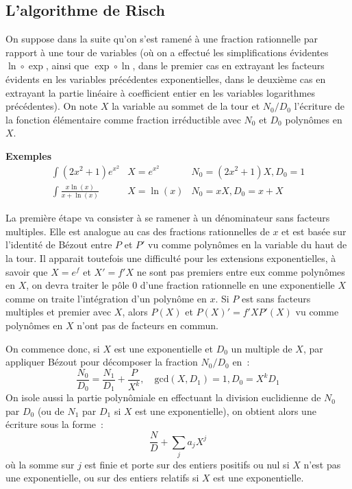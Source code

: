 \documentclass[a4paper,11pt]{book}
\begin{document}
\begin{giacjshere}
\section{L'algorithme de Risch} \label{sec:risch}
On suppose dans la suite qu'on s'est ramené à une fraction rationnelle
par rapport à une tour de variables (où on a effectué les simplifications
évidentes $\ln \circ \exp$, ainsi que $\exp \circ \ln$, dans le
premier cas en extrayant les facteurs évidents en les variables
précédentes exponentielles, dans le deuxième cas en extrayant la
partie linéaire à coefficient entier en les variables logarithmes
précédentes).
On note $X$ la variable au sommet de la tour et $N_0/D_0$ l'écriture
de la fonction élémentaire comme fraction irréductible avec
$N_0$ et $D_0$ polynômes en $X$.

{\bf Exemples}\\
\begin{eqnarray*}
\int (2x^2+1) e^{x^2} & X=e^{x^2} & N_0=(2x^2+1) X, D_0=1 \\
\int \frac{x \ln(x)}{x+\ln(x)} & X=\ln(x) & N_0=xX, D_0=x+X
\end{eqnarray*}

La première étape va consister à se ramener à un dénominateur sans facteurs
multiples. Elle est analogue au cas des fractions
rationnelles de $x$ et est basée sur l'identité de Bézout entre
$P$ et $P'$ vu comme polynômes en la variable du haut de la tour. 
Il apparait toutefois une difficulté pour les
extensions exponentielles, à savoir que $X=e^f$ et $X'=f' X$
ne sont pas premiers entre eux comme polynômes en $X$, on devra
traiter le pôle 0 d'une fraction rationnelle en une exponentielle $X$ comme
on traite l'intégration d'un polynôme en $x$.
Si $P$ est sans facteurs multiples et premier avec $X$, alors
$P(X)$ et $P(X)'=f' X P'(X)$ vu comme
polynômes en $X$ n'ont pas de facteurs en commun.

On commence donc, si $X$ est une exponentielle et $D_0$ un
multiple de $X$, par appliquer Bézout pour décomposer la fraction $N_0/D_0$
en~:
\[ \frac{N_0}{D_0}
=\frac{N_1}{D_1} + \frac{P}{X^{k} } , \quad \mbox{gcd}(X,D_1)=1, D_0=X^k D_1\]
On isole aussi la partie polynômiale en effectuant
la division euclidienne de $N_0$ par $D_0$ (ou de $N_1$ par $D_1$ si $X$
est une exponentielle),
on obtient alors une écriture sous la forme~:
\[ \frac{N}{D} + \sum_j a_j X^j\]
où la somme sur $j$ est finie et porte sur des entiers positifs ou nul 
si $X$ n'est pas une exponentielle, ou sur des entiers relatifs si $X$
est une exponentielle.


\end{giacjshere}
\end{document}
